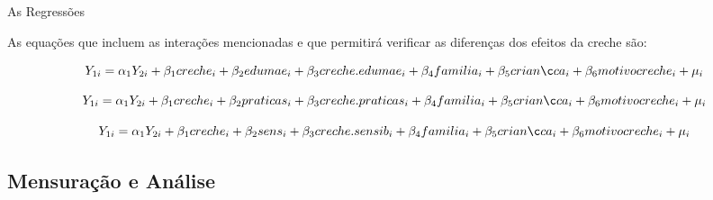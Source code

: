\documentclass[10pt]{Beamer}
\begin{document}
\begin{frame}{As Regressões}

\begin{itemize}
\begin{block}
\item As equações que incluem as interações mencionadas e que permitirá verificar as diferenças dos efeitos da creche são:
\end{block}
\end{itemize}

\begin{equation}
Y_{1i} = \alpha_1Y_{2i} + \beta_1creche_i + \beta_2edumae_i + \beta_3creche.edumae_i + \beta_4familia_i \\ + \beta_5criança_i + \beta_6motivocreche_i + \mu_i
\end{equation}

\begin{equation}
Y_{1i} = \alpha_1Y_{2i} + \beta_1creche_i + \beta_2praticas_i + \beta_3creche.praticas_i + \beta_4familia_i \\ + \beta_5criança_i + \beta_6motivocreche_i + \mu_i
\end{equation}

\begin{equation}
Y_{1i} = \alpha_1Y_{2i} + \beta_1creche_i + \beta_2sens_i + \beta_3creche.sensib_i + \beta_4familia_i \\ + \beta_5criança_i + \beta_6motivocreche_i + \mu_i
\end{equation}

\end{frame}

\subsection{Mensuração e Análise}
	
\end{document}
